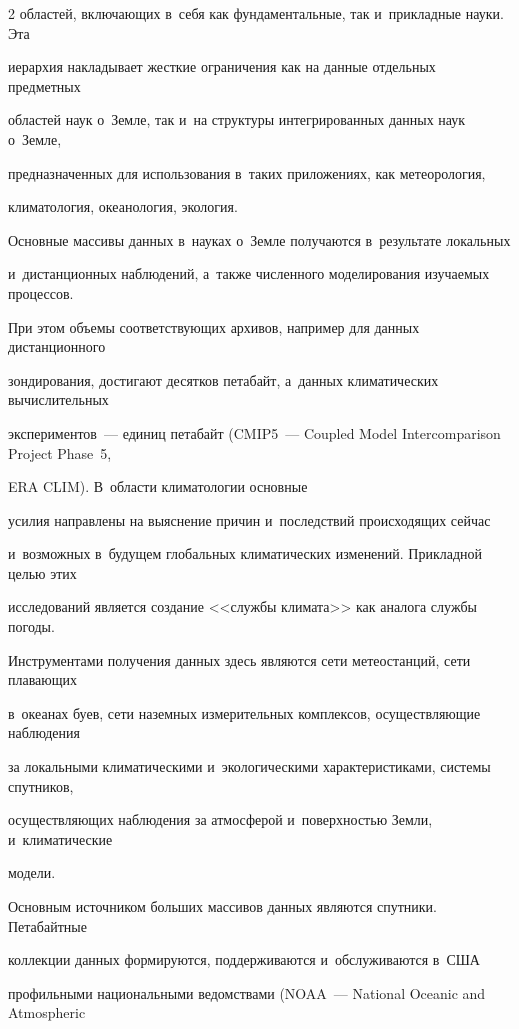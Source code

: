 \begin{multicols}{2}
областей, включающих в~себя как фундаментальные, так и~прикладные науки. Эта 


иерархия накладывает жесткие ограничения как на данные отдельных предметных 


областей наук о~Земле, так и~на структуры интегрированных данных наук о~Земле, 


предназначенных для использования в~таких приложениях, как метеорология, 


климатология, океанология, экология. 


  


  Основные массивы данных в~науках о~Земле получаются в~результате локальных 


и~дистанционных наблюдений, а~также численного моделирования изучаемых процессов. 


При этом объемы соответствующих архивов, например для данных дистанционного 


зондирования, достигают десятков петабайт, а~данных климатических вычислительных 


экспериментов~--- единиц петабайт (CMIP5~--- Coupled Model Intercomparison Project Phase~5, 


ERA CLIM). В~об\-ласти климатологии основные 


усилия направлены на выяснение причин и~последствий происходящих сейчас 


и~возможных в~будущем глобальных климатических изменений. Прикладной целью этих 


исследований является создание <<службы климата>> как аналога службы погоды. 


Инструментами получения данных здесь являются сети метеостанций, сети плавающих 


в~океанах буев, сети наземных измерительных комплексов, осуществляющие наблюдения 


за локальными климатическими и~экологическими характеристиками, системы спутников, 


осуществляющих наблюдения за атмосферой и~поверхностью Земли, и~климатические 


модели.


  


  Основным источником больших массивов данных являются спутники. Петабайтные 


коллекции данных формируются, поддерживаются и~обслуживаются в~США 


профильными национальными ведомствами (NOAA~--- National Oceanic and Atmospheric



\end{multicols}
